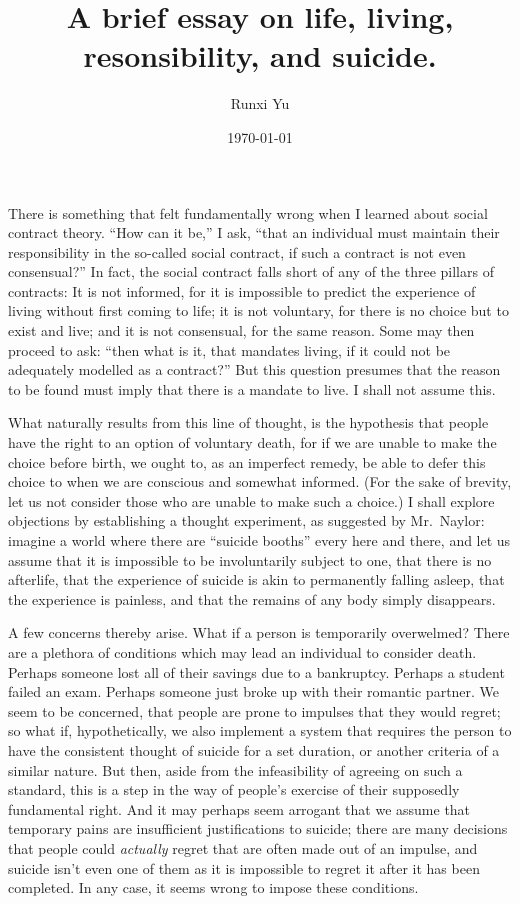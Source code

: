 \documentclass{scrartcl}
\title{A brief essay on life, living, resonsibility, and suicide.}
\author{Runxi Yu}
\date{\today}
\begin{document}
\maketitle

There is something that felt fundamentally wrong when I learned about
social contract theory. ``How can it be,'' I ask, ``that an individual
must maintain their responsibility in the so-called social contract, if
such a contract is not even consensual?'' In fact, the social contract
falls short of any of the three pillars of contracts: It is not
informed, for it is impossible to predict the experience of living
without first coming to life; it is not voluntary, for there is no
choice but to exist and live; and it is not consensual, for the same
reason. Some may then proceed to ask: ``then what is it, that mandates
living, if it could not be adequately modelled as a contract?'' But this
question presumes that the reason to be found must imply that there is a
mandate to live. I shall not assume this.

What naturally results from this line of thought, is the hypothesis that
people have the right to an option of voluntary death, for if we are
unable to make the choice before birth, we ought to, as an imperfect
remedy, be able to defer this choice to when we are conscious and
somewhat informed. (For the sake of brevity, let us not consider those
who are unable to make such a choice.) I shall explore objections by
establishing a thought experiment, as suggested by Mr.\ Naylor: imagine
a world where there are ``suicide booths'' every here and there, and let
us assume that it is impossible to be involuntarily subject to one, that
there is no afterlife, that the experience of suicide is akin to
permanently falling asleep, that the experience is painless, and that
the remains of any body simply disappears.

A few concerns thereby arise. What if a person is temporarily
overwelmed? There are a plethora of conditions which may lead an
individual to consider death. Perhaps someone lost all of their savings
due to a bankruptcy. Perhaps a student failed an exam. Perhaps someone
just broke up with their romantic partner. We seem to be concerned, that
people are prone to impulses that they would regret; so what if,
hypothetically, we also implement a system that requires the person to
have the consistent thought of suicide for a set duration, or another
criteria of a similar nature.  But then, aside from the infeasibility of
agreeing on such a standard, this is a step in the way of people's
exercise of their supposedly fundamental right. And it may perhaps seem
arrogant that we assume that temporary pains are insufficient
justifications to suicide; there are many decisions that people could
\emph{actually} regret that are often made out of an impulse, and
suicide isn't even one of them as it is impossible to regret it after it
has been completed. In any case, it seems wrong to impose these
conditions.
\end{document}
